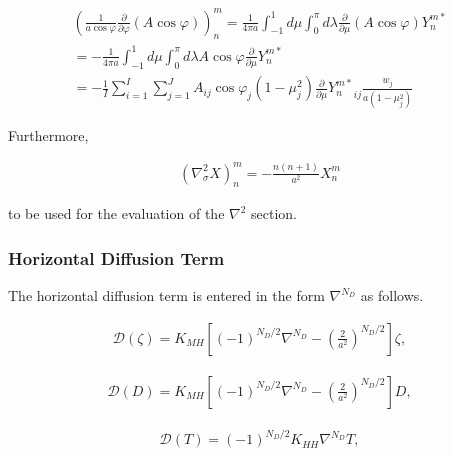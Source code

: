 \begin{eqnarray}
  \left( \frac{1}{a\cos\varphi}
         \frac{\partial{}}{\partial {\varphi}} (A\cos\varphi) \right)_n^m
    =  \frac{1}{4 \pi a}
         \int_{-1}^{1} d \mu \int_{0}^{\pi} d \lambda
           \frac{\partial{}}{\partial {\mu}} (A\cos\varphi) Y_n^{m *}  \\
    =  - \frac{1}{4 \pi a}
         \int_{-1}^{1} d \mu \int_{0}^{\pi} d \lambda
           A \cos\varphi \frac{\partial }{\partial \mu} Y_n^{m *}
            \\
   =  - \frac{1}{I} \sum_{i=1}^{I} \sum_{j=1}^{J}  
          A_{ij}  \cos\varphi_j
          (1-\mu_j^2)  \frac{\partial }{\partial \mu}
          {Y_n^{m *}}_{ij} \frac{w_j}{a(1-\mu_j^{2})}
\end{eqnarray}

Furthermore,

\begin{eqnarray}
     \left( \nabla^{2}_{\sigma} X \right)_n^m
       =  - \frac{n(n+1)}{a^{2}} X_n^m
\end{eqnarray}

to be used for the evaluation of the \(\nabla^2\) section.

\hypertarget{horizontal-diffusion-term}{%
\subsubsection{Horizontal Diffusion
Term}\label{horizontal-diffusion-term}}

The horizontal diffusion term is entered in the form \(\nabla^{N_D}\) as
follows.

\begin{eqnarray}
  {\mathcal D}(\zeta) = K_{MH}
                      \left[ (-1)^{N_D/2} \nabla^{N_D}
                              - \left( \frac{2}{a^2} \right)^{N_D/2}
                      \right]
                    \zeta ,
\end{eqnarray}

\begin{eqnarray}
     {\mathcal D}(D) = K_{MH}
                      \left[ (-1)^{N_D/2} \nabla^{N_D}
                              - \left( \frac{2}{a^2} \right)^{N_D/2}
                      \right]
                    D ,
\end{eqnarray}

\begin{eqnarray}
    {\mathcal D}(T) = (-1)^{N_D/2} K_{HH} \nabla^{N_D} T ,
\end{eqnarray}

